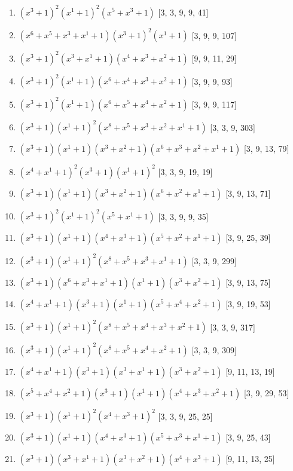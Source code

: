 \documentclass[10pt,twocolumn]{article}
\begin{document}
\begin{enumerate}
\item $(x^{3} + 1)^{2}(x^{1} + 1)^{2}(x^{5} + x^{3} + 1)$  [3, 3, 9, 9, 41]
\item $(x^{6} + x^{5} + x^{3} + x^{1} + 1)(x^{3} + 1)^{2}(x^{1} + 1)$  [3, 9, 9, 107]
\item $(x^{3} + 1)^{2}(x^{3} + x^{1} + 1)(x^{4} + x^{3} + x^{2} + 1)$  [9, 9, 11, 29]
\item $(x^{3} + 1)^{2}(x^{1} + 1)(x^{6} + x^{4} + x^{3} + x^{2} + 1)$  [3, 9, 9, 93]
\item $(x^{3} + 1)^{2}(x^{1} + 1)(x^{6} + x^{5} + x^{4} + x^{2} + 1)$  [3, 9, 9, 117]
\item $(x^{3} + 1)(x^{1} + 1)^{2}(x^{8} + x^{5} + x^{3} + x^{2} + x^{1} + 1)$  [3, 3, 9, 303]
\item $(x^{3} + 1)(x^{1} + 1)(x^{3} + x^{2} + 1)(x^{6} + x^{3} + x^{2} + x^{1} + 1)$  [3, 9, 13, 79]
\item $(x^{4} + x^{1} + 1)^{2}(x^{3} + 1)(x^{1} + 1)^{2}$  [3, 3, 9, 19, 19]
\item $(x^{3} + 1)(x^{1} + 1)(x^{3} + x^{2} + 1)(x^{6} + x^{2} + x^{1} + 1)$  [3, 9, 13, 71]
\item $(x^{3} + 1)^{2}(x^{1} + 1)^{2}(x^{5} + x^{1} + 1)$  [3, 3, 9, 9, 35]
\item $(x^{3} + 1)(x^{1} + 1)(x^{4} + x^{3} + 1)(x^{5} + x^{2} + x^{1} + 1)$  [3, 9, 25, 39]
\item $(x^{3} + 1)(x^{1} + 1)^{2}(x^{8} + x^{5} + x^{3} + x^{1} + 1)$  [3, 3, 9, 299]
\item $(x^{3} + 1)(x^{6} + x^{3} + x^{1} + 1)(x^{1} + 1)(x^{3} + x^{2} + 1)$  [3, 9, 13, 75]
\item $(x^{4} + x^{1} + 1)(x^{3} + 1)(x^{1} + 1)(x^{5} + x^{4} + x^{2} + 1)$  [3, 9, 19, 53]
\item $(x^{3} + 1)(x^{1} + 1)^{2}(x^{8} + x^{5} + x^{4} + x^{3} + x^{2} + 1)$  [3, 3, 9, 317]
\item $(x^{3} + 1)(x^{1} + 1)^{2}(x^{8} + x^{5} + x^{4} + x^{2} + 1)$  [3, 3, 9, 309]
\item $(x^{4} + x^{1} + 1)(x^{3} + 1)(x^{3} + x^{1} + 1)(x^{3} + x^{2} + 1)$  [9, 11, 13, 19]
\item $(x^{5} + x^{4} + x^{2} + 1)(x^{3} + 1)(x^{1} + 1)(x^{4} + x^{3} + x^{2} + 1)$  [3, 9, 29, 53]
\item $(x^{3} + 1)(x^{1} + 1)^{2}(x^{4} + x^{3} + 1)^{2}$  [3, 3, 9, 25, 25]
\item $(x^{3} + 1)(x^{1} + 1)(x^{4} + x^{3} + 1)(x^{5} + x^{3} + x^{1} + 1)$  [3, 9, 25, 43]
\item $(x^{3} + 1)(x^{3} + x^{1} + 1)(x^{3} + x^{2} + 1)(x^{4} + x^{3} + 1)$  [9, 11, 13, 25]

\end{enumerate}
\end{document}
